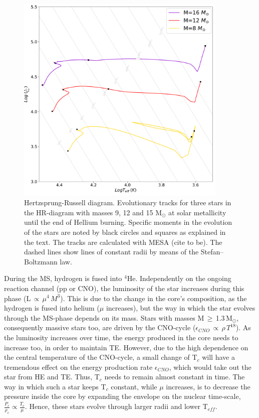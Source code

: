 \begin{figure}[H]
    \centering
    \includegraphics[width=0.9\textwidth]{Thesis/graphs/HR_massive_stars.pdf}
    \caption{Hertzsprung-Russell diagram. Evolutionary tracks for three stars in the HR-diagram with masses 9, 12 and 15 M$_{\odot}$ at solar metallicity until the end of Hellium burning. Specific moments in the evolution of the stars are noted by black circles and squares as explained in the text. The tracks are calculated with MESA (cite to be). The dashed lines show lines of constant radii by means of the Stefan–Boltzmann law.}
    \label{fig:HR_massive_stars}
\end{figure}

During the MS, hydrogen is fused into $^4$He. Independently on the ongoing reaction channel (pp or CNO), the luminosity of the star increases during this phase (L$\,\propto\,\mu^{4}\,M^3$). This is due to the change in the core's composition, as the hydrogen is fused into helium ($\mu$ increases), but the way in which the star evolves through the MS-phase depends on its mass. Stars with masses M\,$\geq$\,1.3\,M$_\odot$, consequently massive stars too, are driven by the CNO-cycle ($\epsilon_{CNO}\,\propto\,\rho\,T^{18}$). As the luminosity increases over time, the energy produced in the core needs to increase too, in order to maintain TE. However, due to the high dependence on the central temperature of the CNO-cycle, a small change of T$_c$ will have a tremendous effect on the energy production rate $\epsilon_{CNO}$, which would take out the star from HE and TE. Thus, T$_c$ needs to remain almost constant in time. The way in which such a star keeps T$_c$ constant, while $\mu$ increases, is to decrease the pressure inside the core by expanding the envelope on the nuclear time-scale, $\frac{P_c}{\rho_c} \propto \frac{T_c}{\mu}$. Hence, these stars evolve through larger radii and lower T$_{eff}$. 

